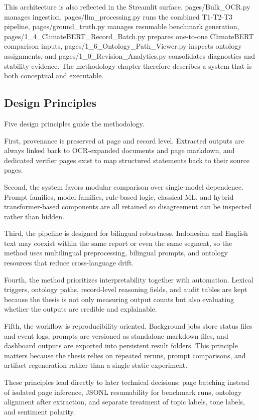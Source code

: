 This architecture is also reflected in the Streamlit surface. pages/Bulk\_OCR.py manages ingestion, pages/llm\_processing.py runs the combined T1-T2-T3 pipeline, pages/ground\_truth.py manages resumable benchmark generation, pages/1\_4\_ClimateBERT\_Record\_Batch.py prepares one-to-one ClimateBERT comparison inputs, pages/1\_6\_Ontology\_Path\_Viewer.py inspects ontology assignments, and pages/1\_0\_Revision\_Analytics.py consolidates diagnostics and stability evidence. The methodology chapter therefore describes a system that is both conceptual and executable.

\subsection{Design Principles}

Five design principles guide the methodology.

First, provenance is preserved at page and record level. Extracted outputs are always linked back to OCR-expanded documents and page markdown, and dedicated verifier pages exist to map structured statements back to their source pages.

Second, the system favors modular comparison over single-model dependence. Prompt families, model families, rule-based logic, classical ML, and hybrid transformer-based components are all retained so disagreement can be inspected rather than hidden.

Third, the pipeline is designed for bilingual robustness. Indonesian and English text may coexist within the same report or even the same segment, so the method uses multilingual preprocessing, bilingual prompts, and ontology resources that reduce cross-language drift.

Fourth, the method prioritizes interpretability together with automation. Lexical triggers, ontology paths, record-level reasoning fields, and audit tables are kept because the thesis is not only measuring output counts but also evaluating whether the outputs are credible and explainable.

Fifth, the workflow is reproducibility-oriented. Background jobs store status files and event logs, prompts are versioned as standalone markdown files, and dashboard outputs are exported into persistent result folders. This principle matters because the thesis relies on repeated reruns, prompt comparisons, and artifact regeneration rather than a single static experiment.

These principles lead directly to later technical decisions: page batching instead of isolated page inference, JSONL resumability for benchmark runs, ontology alignment after extraction, and separate treatment of topic labels, tone labels, and sentiment polarity.

